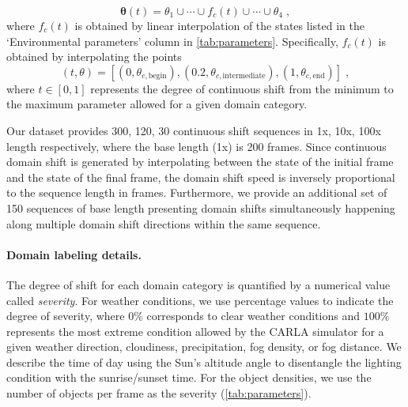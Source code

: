 \begin{equation}
    \bm{\theta}(t) = \theta_1 \cup \cdots \cup f_c(t) \cup \cdots \cup \theta_4 \; ,
\end{equation}
where $f_c(t)$ is obtained by linear interpolation of the states listed in the `Environmental parameters' column in  \autoref{tab:parameters}. Specifically, $f_c(t)$ is obtained by interpolating the points
\begin{equation}
   (t, \theta) = [ \left(0, \theta_{c, \mathrm{begin}}\right),  \left(0.2, \theta_{c, \mathrm{intermediate}}\right), \left(1, \theta_{c, \mathrm{end}}\right)] \; ,
\end{equation}
where $t \in [0, 1]$ represents the degree of continuous shift from the minimum to the maximum parameter allowed for a given domain category.

Our dataset provides 300, 120, 30 continuous shift sequences in 1x, 10x, 100x length respectively, where the base length (1x) is 200 frames. Since continuous domain shift is generated by interpolating between the state of the initial frame and the state of the final frame, the domain shift speed is inversely proportional to the sequence length in frames.
Furthermore, we provide an additional set of 150 sequences of base length presenting domain shifts simultaneously happening along multiple domain shift directions within the same sequence. 

\paragraph{Domain labeling details.}
The degree of shift for each domain category is quantified by a numerical value called \textit{severity}. For weather conditions, we use percentage values to indicate the degree of severity, where $0\%$ corresponds to clear weather conditions and $100\%$ represents the most extreme condition allowed by the CARLA simulator for a given weather direction, \eg{} cloudiness, precipitation, fog density, or fog distance. We describe the time of day using the Sun's altitude angle to disentangle the lighting condition with the sunrise/sunset time. For the object densities, we use the number of objects per frame as the severity (\autoref{tab:parameters}).

